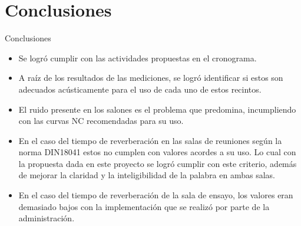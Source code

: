 \documentclass{sintefbeamer}
\begin{document}
\section{Conclusiones}
\begin{frame}{Conclusiones}
    \begin{itemize}
        \item Se logró cumplir con las actividades propuestas en el cronograma.
        \item A raíz de los resultados de las mediciones, se logró identificar si estos son adecuados acústicamente para el uso de cada uno de estos recintos.
        \item El ruido presente en los salones es el problema que predomina, incumpliendo con las curvas NC recomendadas para su uso.
        \item En el caso del tiempo de reverberación en las salas de reuniones según la norma DIN18041 estos no cumplen con valores acordes a su uso. Lo cual con la propuesta dada en este proyecto se logró cumplir con este criterio, además de mejorar la claridad y la inteligibilidad de la palabra en ambas salas.
        \item En el caso del tiempo de reverberación de la sala de ensayo, los valores eran demasiado bajos con la implementación que se realizó por parte de la administración.
    \end{itemize}
\end{frame}


\backmatter
\end{document}

